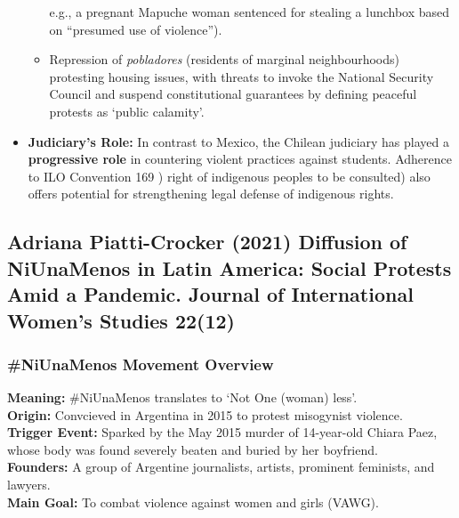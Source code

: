 \documentclass{article}
\begin{document}
\begin{itemize}
\begin{itemize}
            e.g., a pregnant Mapuche woman sentenced for stealing a lunchbox
            based on ``presumed use of violence'').
            \item Repression of
            \textit{pobladores} (residents of marginal neighbourhoods)
            protesting housing issues, with threats to invoke the National
            Security Council and suspend constitutional guarantees by
            defining peaceful protests as `public calamity'.
        \end{itemize}
        \item \textbf{Judiciary's Role:} In contrast to Mexico, the Chilean
        judiciary has played a \textbf{progressive role} in countering
        violent practices against students. Adherence to ILO Convention 169 )
        right of indigenous peoples to be consulted) also offers potential
        for strengthening legal defense of indigenous rights.
    \end{itemize}

    \subsection{Adriana Piatti-Crocker (2021) Diffusion of NiUnaMenos in Latin America: Social Protests Amid a Pandemic. Journal of International Women’s Studies 22(12)}

    \subsubsection{\#NiUnaMenos Movement Overview}

    \noindent \textbf{Meaning:} \#NiUnaMenos translates to `Not One (woman)
less'.\\

    \noindent \textbf{Origin:} Convcieved in Argentina in 2015 to protest
misogynist violence.\\

    \noindent \textbf{Trigger Event:} Sparked by the May 2015 murder of
14-year-old Chiara Paez, whose body was found severely beaten and buried by
her boyfriend.\\

    \noindent \textbf{Founders:} A group of Argentine journalists, artists,
prominent feminists, and lawyers.\\

    \noindent \textbf{Main Goal:} To combat violence against women and
girls (VAWG).\\
\end{document}
